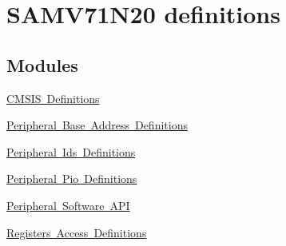 \hypertarget{group__SAMV71N20__definitions}{}\section{S\+A\+M\+V71\+N20 definitions}
\label{group__SAMV71N20__definitions}
\subsection*{Modules}
\begin{DoxyCompactItemize}
\item 
\mbox{\hyperlink{group__SAMV71N20__cmsis}{C\+M\+S\+I\+S Definitions}}
\item 
\mbox{\hyperlink{group__SAMV71N20__base}{Peripheral Base Address Definitions}}
\item 
\mbox{\hyperlink{group__SAMV71N20__id}{Peripheral Ids Definitions}}
\item 
\mbox{\hyperlink{group__SAMV71N20__pio}{Peripheral Pio Definitions}}
\item 
\mbox{\hyperlink{group__SAMV71N20__api}{Peripheral Software A\+PI}}
\item 
\mbox{\hyperlink{group__SAMV71N20__reg}{Registers Access Definitions}}
\end{DoxyCompactItemize}
